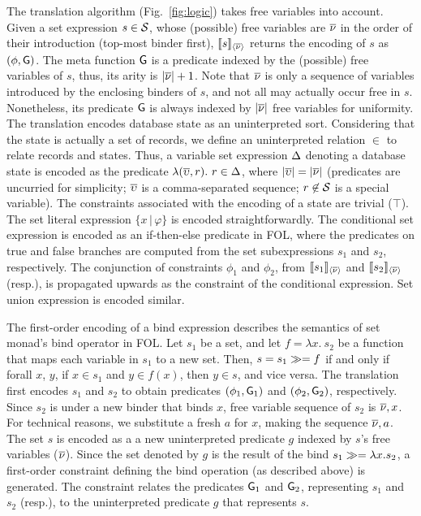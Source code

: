 The translation algorithm (Fig.~\ref{fig:logic}) takes free variables
into account. Given a set expression $s\in\mathcal{S}$, whose (possible) free
variables are $\overline{\nu}$ in the order of their introduction (top-most
binder first), $\llbracket s \rrbracket_{\langle \overline{\nu} \rangle}$ returns the encoding of $s$ as
$(\phi,{\sf G})$.  The meta function ${\sf G}$ is a predicate indexed by the
(possible) free variables of $s$, thus, its arity is $|\overline{\nu}| + 1$.
Note that $\overline{\nu}$ is only a sequence of variables introduced by the
enclosing binders of $s$, and not all may actually occur free in $s$.
Nonetheless, its predicate ${\sf G}$ is always indexed by $|\overline{\nu}|$ free
variables for uniformity. The translation encodes database state as an
uninterpreted sort. Considering that the state is actually a set of
records, we define an uninterpreted relation $\in$ to relate records
and states. Thus, a variable set expression $\Delta$ denoting a database
state is encoded as the predicate $\lambda (\overline{\upsilon},r).~r\in\Delta$, where
$|\overline{\upsilon}|=|\overline{\nu}|$ (predicates are uncurried for simplicity; $\overline{\upsilon}$
is a comma-separated sequence; $r\not\in\mathcal{S}$ is a special variable).
The constraints associated with the encoding of a state are trivial
($\top$). The set literal expression $\{x\,|\, \varphi\}$ is encoded
straightforwardly. The conditional set expression is encoded as an
if-then-else predicate in FOL, where the predicates on true and false
branches are computed from the set subexpressions $s_1$ and $s_2$,
respectively. The conjunction of constraints $\phi_1$ and $\phi_2$,
from $\llbracket s_1 \rrbracket_{\langle \overline{\nu} \rangle}$ and $\llbracket s_2 \rrbracket_{\langle \overline{\nu} \rangle}$ (resp.), is
propagated upwards as the constraint of the conditional expression.
Set union expression is encoded similar.

The first-order encoding of a bind expression describes the semantics
of set monad's bind operator in FOL. Let $s_1$ be a set, and let $f =
\lambda x.~s_2$ be a function that maps each variable in $s_1$ to a
new set. Then, $s = s_1 \gg= f$ if and only if forall $x$, $y$, if
$x\in s_1$ and $y \in f(x)$, then  $y \in s$, and vice versa. The
translation first encodes $s_1$ and $s_2$ to obtain predicates
$(\phi_1,{\sf G}_1)$ and $(\phi_2,{\sf G}_2)$, respectively. Since $s_2$ is
under a new binder that binds $x$, free variable sequence of $s_2$ is
$\overline{\nu},x$. For technical reasons, we substitute a fresh $a$ for $x$,
making the sequence $\overline{\nu},a$. The set $s$ is encoded as a a new
uninterpreted predicate $g$ indexed by $s$'s free variables
($\overline{\nu}$). Since the set denoted by $g$ is the result of the bind
$s_1 \gg= \lambda x.s_2$, a first-order constraint defining the bind
operation (as described above) is generated. The constraint relates the
predicates ${\sf G}_1$ and ${\sf G}_2$, representing $s_1$ and $s_2$ (resp.), to
the uninterpreted predicate $g$ that represents $s$.  


